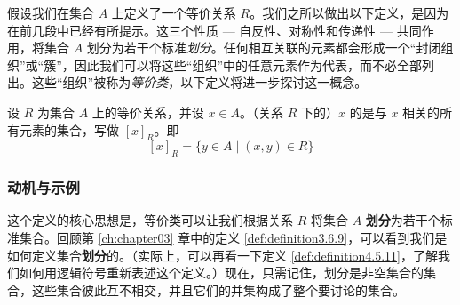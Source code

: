 假设我们在集合 $A$ 上定义了一个等价关系 $R$。我们之所以做出以下定义，是因为在前几段中已经有所提示。这三个性质 --- 自反性、对称性和传递性 --- 共同作用，将集合 $A$ 划分为若干个标准\emph{划分}。任何相互关联的元素都会形成一个``封闭组织''或``簇''，因此我们可以将这些``组织''中的任意元素作为代表，而不必全部列出。这些``组织''被称为\emph{等价类}，以下定义将进一步探讨这一概念。

\begin{definition}
    设 $R$ 为集合 $A$ 上的等价关系，并设 $x \in A$。（关系 $R$ 下的）$x$ 的是与 $x$ 相关的所有元素的集合，写做 $[x]_R$。即
    \[[x]_R = \{y \in A \mid (x,y) \in R\}\]
\end{definition}

\subsubsection*{动机与示例}

这个定义的核心思想是，等价类可以让我们根据关系 $R$ 将集合 $A$ \textbf{划分}为若干个标准集合。回顾第 \ref{ch:chapter03} 章中的定义 \ref{def:definition3.6.9}，可以看到我们是如何定义集合\textbf{划分}的。（实际上，可以再看一下定义 \ref{def:definition4.5.11}，了解我们如何用逻辑符号重新表述这个定义。）现在，只需记住，划分是非空集合的集合，这些集合彼此互不相交，并且它们的并集构成了整个要讨论的集合。\\

